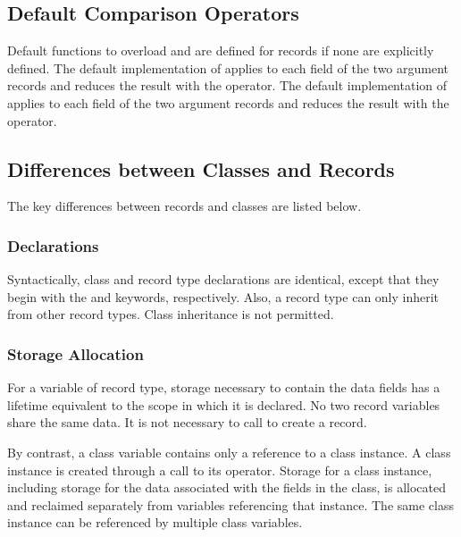 \subsection{Default Comparison Operators}
\label{Record_Comparison_Operators}

Default functions to overload \chpl{==} and \chpl{\!=} are defined for
records if none are explicitly defined.
The default implementation of \chpl{==} applies \chpl{==} to each
field of the two argument records and reduces the result with
the \chpl{&&} operator.  The default implementation of \chpl{\!=}
applies \chpl{\!=} to each field of the two argument records and
reduces the result with the \chpl{||} operator.

\subsection{Differences between Classes and Records}
\label{Class_and_Record_Differences}

The key differences between records and classes are listed below.

\subsubsection{Declarations}
\label{Declaration_Differences}

Syntactically, class and record type declarations are identical, except that
they begin with the  and  keywords, respectively.
Also, a record type can only inherit from other record types.  Class inheritance
is not permitted.

\subsubsection{Storage Allocation}
\label{Storage_Allocation_Differences}

For a variable of record type, storage necessary to contain the data fields
has a lifetime equivalent to the scope in which it is declared.  No two record
variables share the same data.  It is not necessary to call  to create
a record.

By contrast, a class variable contains only a reference to a
class instance.  A class instance is created through a call to its 
operator.  Storage for a class instance, including storage for
the data associated with the fields in the class, is allocated and reclaimed
separately from variables referencing that instance.  The same class instance
can be referenced by multiple class variables.

